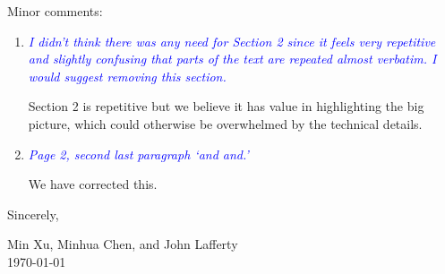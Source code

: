 \documentclass[pdftex,12pt]{article}
\def\rc#1{{\it\textcolor{blue}{#1}}\smallskip}
\begin{document}
Minor comments:

\begin{enumerate}
\item \rc{I didn't think there was any need for Section 2
  since it feels very repetitive and slightly confusing that parts of
  the text are repeated almost verbatim. I would suggest removing this section.}

Section 2 is repetitive but we believe it has value in highlighting the big picture, which could otherwise be overwhelmed by the technical details. 

\item \rc{Page 2, second last paragraph `and and.'}

We have corrected this.

\end{enumerate}


\vspace*{10pt}

Sincerely, 


Min Xu, Minhua Chen, and John Lafferty\\[1pt]
\today{}


\end{document}
